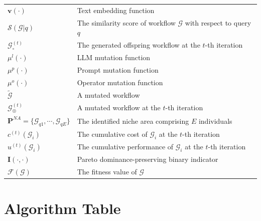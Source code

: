 \documentclass{article}
\theoremstyle{plain}
\theoremstyle{definition}
\theoremstyle{remark}
\begin{document}
\begin{table}[ht]
\begin{tabular}{ll}
$\mathbf{v}(\cdot)$ & Text embedding function \\
$\mathcal{S}(\mathcal{G} | q)$ & The similarity score of workflow $\mathcal{G}$ with respect to query $q$ \\
$\mathcal{G}_\circ^{(t)}$ & The generated offspring workflow at the $t$-th iteration \\
$\mu^l(\cdot)$ & LLM mutation function \\
$\mu^p(\cdot)$ & Prompt mutation function \\
$\mu^o(\cdot)$ & Operator mutation function \\
$\tilde{\mathcal{G}}$ & A mutated workflow \\
$\mathcal{G}^{(t)}_\circledcirc$ & A mutated workflow at the $t$-th iteration \\
$\mathbf{P}^{NA} = \{\mathcal{G}_{q1}, \cdots, \mathcal{G}_{qE}\}$ & The identified niche area comprising $E$ individuals \\
$c^{(t)}(\mathcal{G}_i)$ & The cumulative cost of $\mathcal{G}_i$ at the $t$-th iteration \\
$u^{(t)}(\mathcal{G}_i)$ & The cumulative performance of $\mathcal{G}_i$ at the $t$-th iteration \\
$\mathbf{I}(\cdot, \cdot)$ & Pareto dominance-preserving binary indicator \\
$\mathcal{F}(\mathcal{G})$ & The fitness value of $\mathcal{G}$ \\
\bottomrule
\end{tabular}
\label{tab:notations}
\end{table}


\section{Algorithm Table}
\label{app:alg}
\end{document}

